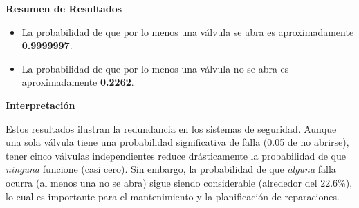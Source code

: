 \documentclass[a4paper]{article}
\begin{document}
\textbf{Resumen de Resultados}

\begin{itemize}
    \item La probabilidad de que por lo menos una válvula se abra es aproximadamente \textbf{0.9999997}.
    \item La probabilidad de que por lo menos una válvula no se abra es aproximadamente \textbf{0.2262}.
\end{itemize}

\textbf{Interpretación}

Estos resultados ilustran la redundancia en los sistemas de seguridad. Aunque una sola válvula tiene una probabilidad significativa de falla (0.05 de no abrirse), tener cinco válvulas independientes reduce drásticamente la probabilidad de que \textit{ninguna} funcione (casi cero). Sin embargo, la probabilidad de que \textit{alguna} falla ocurra (al menos una no se abra) sigue siendo considerable (alrededor del 22.6\%), lo cual es importante para el mantenimiento y la planificación de reparaciones.


 
\end{document}
